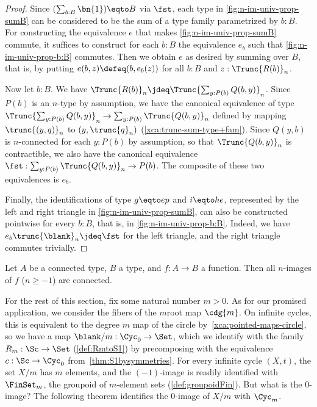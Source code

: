 \begin{proof}
Since $(\sum_{b:B}\bn{1}) \eqto B$ via $\fst$,
each type in \cref{fig:n-im-univ-prop-sumB}
can be considered to be the sum of a type family parametrized by $b:B$.
For constructing the equivalence $e$ that makes
\cref{fig:n-im-univ-prop-sumB} commute, it suffices to
construct for each $b:B$ the equivalence $e_b$ such that
\cref{fig:n-im-univ-prop-b:B} commutes.
Then we obtain $e$ as desired by summing over $B$, that is,
by putting $e(b,z) \defeq (b,e_b(z))$ for all $b:B$ and $z:\Trunc{R(b)}_n$.

\begin{marginfigure}
  \noindent{}
\caption{Taking summands for $b:B$ in \cref{fig:n-im-univ-prop-sumB}.}
\label{fig:n-im-univ-prop-b:B}
\end{marginfigure}

Now let $b:B$. We have $\Trunc{R(b)}_n \jdeq \Trunc{\sum_{y:P(b)} Q(b,y)}_n$.
Since $P(b)$ is an $n$-type by assumption, we have the canonical equivalence
of type $\Trunc{\sum_{y:P(b)} Q(b,y)}_n\to\sum_{y:P(b)}\Trunc{Q(b,y)}_n$ defined
by mapping $\trunc{(y,q)}_n$ to $(y,\trunc{q}_n)$
(\cf \cref{xca:trunc-sum-type+fam}).
Since $Q(y,b)$ is $n$-connected for each $y:P(b)$ by assumption,
so that $\Trunc{Q(b,y)}_n$ is contractible,
we also have the canonical equivalence
$\fst: \sum_{y:P(b)}\Trunc{Q(b,y)}_n \to P(b)$.
The composite of these two equivalences is $e_b$.

Finally, the identifications of type $g\eqto ep$ and $i\eqto he$,
represented by the left and right triangle in \cref{fig:n-im-univ-prop-sumB},
can also be constructed pointwise for every $b:B$, that is,
in \cref{fig:n-im-univ-prop-b:B}. Indeed, we have
$e_b \trunc{\blank}_n \jdeq \fst$ for the left triangle,
and the right triangle commutes trivially.
\end{proof}

\begin{xca}\label{xca:im_preserves_conn}
Let $A$ be a connected type, $B$ a type, and $f:A\to B$ a function.
Then all $n$-images of $f$ ($n\geq-1$) are connected.
\end{xca}

For the rest of this section, fix some natural number $m>0$. As for our
promised application, we consider the fibers of the $m$\th root map $\cdg{m}$.
On infinite cycles, this is equivalent to the degree $m$ map
of the circle by~\cref{xca:pointed-maps-circle}, so we have a map
$\blank/m : \Cyc_0 \to \Set$, which we identify with the family
$R_m : \Sc \to \Set$ (\cref{def:RmtoS1}) by precomposing with the equivalence
$c : \Sc \to \Cyc_0$ from~\cref{thm:S1bysymmetries}.
For every infinite cycle $(X,t)$, the set $X/m$ has $m$ elements,
and the $(-1)$-image is readily identified with $\FinSet_m$,
the groupoid of $m$-element sets (\cref{def:groupoidFin}).
But what is the $0$-image? The following theorem identifies
the $0$-image of $X/m$ with $\Cyc_m$.

